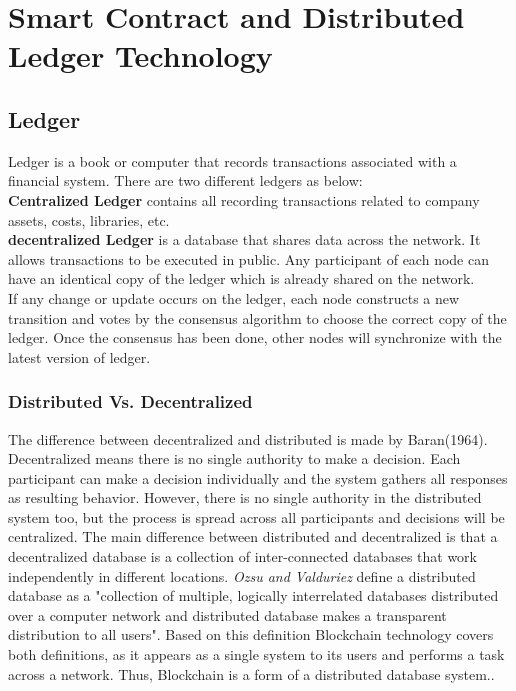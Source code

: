 \chapter{Smart Contract and Distributed Ledger Technology}

\section{Ledger} 
Ledger is a book or computer that records transactions associated with a financial system. There are two different ledgers as below: \\
\textbf{Centralized Ledger} contains all recording transactions related to company assets, costs, libraries, etc. \\
\textbf{decentralized Ledger } is a database that shares data across the network. It allows transactions to be executed in public. Any participant of each node can have an identical copy of the ledger which is already shared on the network.\\
If any change or update occurs on the ledger, each node constructs a new transition and votes by the consensus algorithm to choose the correct copy of the ledger. Once the consensus has been done, other nodes will synchronize with the latest version of ledger\cite{Markos}.

\subsection{Distributed Vs. Decentralized } 
The difference between decentralized and distributed is made by Baran(1964). Decentralized means there is no single authority to make a decision. Each participant can make a decision individually and the system gathers all responses as resulting behavior. However, there is no single authority in the distributed system too, but the process is spread across all participants and decisions will be centralized. The main difference between distributed and decentralized is that a decentralized database is a collection of inter-connected databases that work independently in different locations. \textit{Ozsu and Valduriez} define a distributed database as a "collection of multiple, logically interrelated databases distributed over a computer network and distributed database makes a transparent distribution to all users"\cite{Ozsu}. Based on this definition Blockchain technology covers both definitions, as it appears as a single system to its users and performs a task across a network. Thus, Blockchain is a form of a distributed database system.\cite{Markos}.


